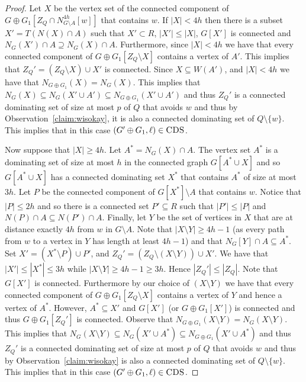 \documentclass[11pt]{article}
\newcommand{\tCDS}{{\texttt{\sc CDS}}}
\begin{document}
\begin{proof}
Let $X$ be the vertex set of the connected component of $G\oplus G_1[Z_Q \cap N_{G\setminus A}^{4h}[w]]$ that contains $w$. 
If $|X| < 4h$ then there is a subset $X' = T(N(X) \cap A)$ such that $X' \subset R$, $|X'| \leq |X|$, $G[X']$ is connected and 
$N_G(X') \cap A \supseteq N_G(X) \cap A$.  Furthermore, since $|X| < 4h$ we have that every connected component of $G\oplus G_1[Z_Q\setminus X]$ contains a vertex of $A'$. This implies that  $Z_Q' = (Z_Q \setminus X) \cup X'$ is connected. Since $X \subseteq W(A')$,  and $|X| < 4h$ we have that $N_{G\oplus G_1}(X)=N_{G}(X)$. This implies that 
$N_G(X) \subseteq N_{G}(X'\cup A') \subseteq N_{G\oplus G_1}(X'\cup A') $ and thus $Z_Q'$ is a connected dominating set of size at most $p$ of $Q$ that avoids $w$ and thus by Observation~\ref{claim:wisokay}, it  is also a connected dominating set of $Q\setminus \{w\}$. This implies that in this case $(G'\oplus G_1,\ell)\in \tCDS$.   







Now suppose that $|X| \geq 4h$. Let $A^* = N_G(X) \cap A$. The vertex set $A^*$ is a dominating set of size at most $h$ in the connected graph $G[A^* \cup X]$ and so $G[A^* \cup X]$ has a connected dominating set $X^*$ that contains $A^*$ of size at most $3h$. Let $P$ be the connected component of $G[X^*] \setminus A$ that contains $w$. Notice that $|P| \leq 2h$ and so there is a connected set $P' \subseteq R$ such that $|P'|\leq |P|$ and $N(P) \cap A \subseteq N(P') \cap A$. Finally, let $Y$ be the set of vertices in $X$ that are at distance exactly $4h$ from $w$ in $G \setminus A$. Note that $|X \setminus Y| \geq 4h-1$ (as every path from $w$ to  a vertex in $Y$ has length at least $4h-1$) and that $N_G[Y] \cap A \subseteq A^*$. Set 
$X' = (X^* \setminus P) \cup P'$, and $Z_{Q}' = (Z_{Q} \setminus (X \setminus Y)) \cup X'$. We have that $|X'| \leq |X^*| \leq 3h$ while $|X \setminus Y| \geq 4h-1 \geq 3h$. Hence $|Z_Q'| \leq |Z_Q|$.  Note that $G[X']$ is connected. Furthermore by our choice of 
$(X\setminus Y)$ we have that every connected component of $G\oplus G_1[Z_Q\setminus X]$ contains a vertex of 
$Y$ and hence a vertex of $A^*$. However, $A^*\subseteq X'$ and $G[X']$ (or $G\oplus {G_1}[X']$)  is connected and thus  
$G\oplus G_1[Z_Q']$ is connected.  Observe that $N_{G\oplus G_1}(X\setminus Y)=N_{G}(X\setminus Y)$. This implies that 
$N_G(X\setminus Y) \subseteq N_{G}(X'\cup A^*) \subseteq N_{G\oplus G_1}(X'\cup A^*) $ and thus $Z_Q'$ is a connected dominating set of size at most $p$ of $Q$ that avoids $w$ and thus by Observation~\ref{claim:wisokay} is also a connected dominating set of $Q\setminus \{w\}$. This implies that in this case $(G'\oplus G_1,\ell)\in \tCDS$.   














\end{proof}
\end{document}
